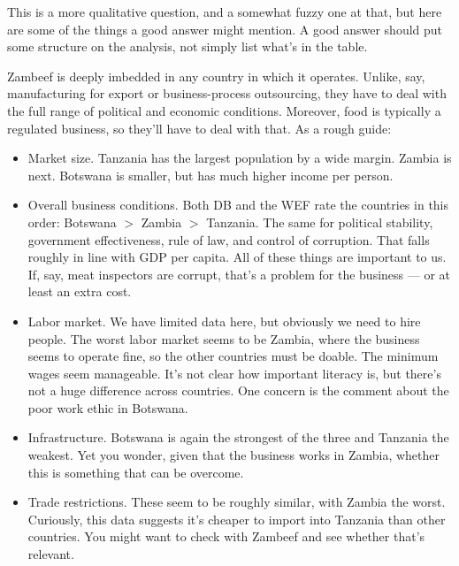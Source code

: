 \documentclass[letterpaper,12pt]{exam}
\begin{document}
\begin{questions}
\begin{solution}
This is a more qualitative question, and a somewhat fuzzy one at that,
but here are some of the things a good answer might mention.
A good answer should put some structure on the analysis,
not simply list what's in the table.
%
\begin{parts}
\item Zambeef is deeply imbedded in any country in which it operates.
Unlike, say, manufacturing for export or business-process outsourcing,
they have to deal with the full range of political and economic conditions.
Moreover, food is typically a regulated business, so they'll have to deal with that.
As a rough guide:
\begin{itemize}
\item Market size.
Tanzania has the largest population by a wide margin.
Zambia is next.
Botswana is smaller, but has much higher income per person.

\item Overall business conditions.
Both DB and the WEF rate the countries in this order:
Botswana $>$ Zambia $>$ Tanzania.
The same for political stability,
government effectiveness, rule of law, and control of corruption.
That falls roughly in line with GDP per capita.
All of these things are important to us.
If, say, meat inspectors are corrupt, that's a problem for the business
--- or at least an extra cost.

\item Labor market.
We have limited data here, but obviously we need to hire people.
The worst labor market seems to be Zambia, where the business seems to operate fine,
so the other countries must be doable.
The minimum wages seem manageable.
It's not clear how important literacy is, but there's not a huge difference
across countries.
One concern is the comment about the poor work ethic in Botswana.

\item Infrastructure.
Botswana is again the strongest of the three and Tanzania the weakest.
Yet you wonder, given that the business works in Zambia,
whether this is something that can be overcome.

\item Trade restrictions.
These seem to be roughly similar, with Zambia the worst.
Curiously, this data suggests it's cheaper to import into
Tanzania than other countries.
You might want to check with Zambeef and see whether that's relevant.
\end{itemize}


\end{parts}
\end{solution}
\end{questions}
\end{document}
